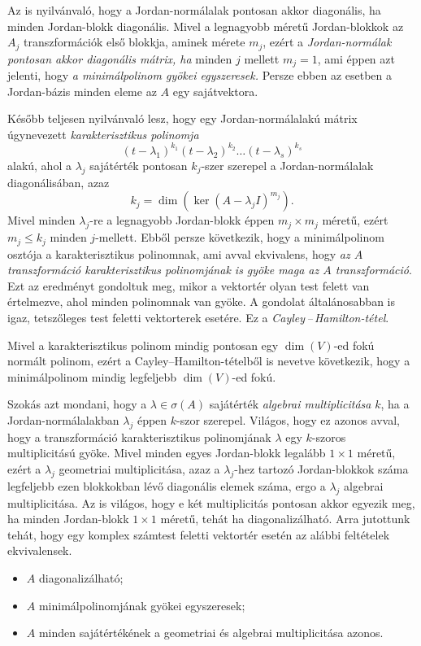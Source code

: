 \documentclass[a4paper, showtrims]{memoir}
\theoremstyle{plain}
\theoremstyle{remark}
\theoremstyle{definition}
\begin{document}
Az is nyilvánvaló, hogy a Jordan-normálalak pontosan akkor diagonális, ha minden Jordan-blokk diagonális.
Mivel a legnagyobb méretű Jordan-blokkok az $A_j$ transzformációk első blokkja, aminek mérete $m_j$, ezért a \emph{Jordan-normálak pontosan akkor diagonális mátrix, ha} minden $j$ mellett $m_j=1$,
ami éppen azt jelenti, hogy \emph{a minimálpolinom gyökei egyszeresek.}
Persze ebben az esetben a Jordan-bázis minden eleme az $A$ egy sajátvektora.

Később teljesen nyilvánvaló lesz, hogy egy Jordan-normálalakú mátrix
úgynevezett \emph{karakterisztikus polinomja}
\[
	\left( t-\lambda_1 \right)^{k_1}\left( t-\lambda_2 \right)^{k_2}\dots\left( t-\lambda_s \right)^{k_s}
\]
alakú,
ahol a $\lambda_j$ sajátérték pontosan $k_j$-szer szerepel a Jordan-normálalak diagonálisában,
azaz
\[
    k_j=\dim\left( \ker \left( A-\lambda_j I \right)^{m_j} \right).
\]
Mivel minden $\lambda_j$-re a legnagyobb Jordan-blokk éppen $m_j\times m_j$ méretű,
ezért $m_j\leq k_j$ minden $j$-mellett.
Ebből persze következik,
hogy a minimálpolinom osztója a karakterisztikus polinomnak, ami
avval ekvivalens,
hogy \emph{az $A$ transzformáció karakterisztikus polinomjának is gyöke maga az $A$ transzformáció}.
Ezt az eredményt gondoltuk meg, mikor a vektortér olyan test felett van értelmezve,
ahol minden polinomnak van gyöke.
A gondolat általánosabban is igaz, tetszőleges test feletti vektorterek esetére.
Ez a \emph{Cayley\,--\,Hamilton-tétel}.

Mivel a karakterisztikus polinom mindig pontosan egy $\dim(V)$-ed fokú normált polinom,
ezért a Cayley--Hamilton-tételből is nevetve következik,
hogy a minimálpolinom mindig legfeljebb $\dim(V)$-ed fokú.

Szokás azt mondani, hogy a $\lambda\in\sigma\left( A \right)$ sajátérték
\emph{algebrai multiplicitása} $k$,
ha a Jordan-normál\-a\-lak\-ban $\lambda_j$ éppen $k$-szor szerepel.
Világos, hogy ez azonos avval, hogy a transzformáció karakterisztikus polinomjának
$\lambda$ egy $k$-szoros multiplicitású gyöke.
Mivel minden egyes Jordan-blokk legalább $1\times 1$ méretű,
ezért a $\lambda_j$ geometriai multiplicitása,
azaz a $\lambda_j$-hez tartozó Jordan-blokkok száma legfeljebb ezen blokkokban lévő diagonális elemek száma,
ergo a $\lambda_j$ algebrai multiplicitása.
Az is világos, hogy e két multiplicitás pontosan akkor egyezik meg,
ha minden Jordan-blokk $1\times 1$ méretű, tehát ha diagonalizálható.
Arra jutottunk tehát,
hogy egy komplex számtest feletti vektortér esetén az alábbi feltételek ekvivalensek.
\begin{itemize}\tightlist
	\item[\textendash] $A$ diagonalizálható;
	\item[\textendash] $A$ minimálpolinomjának gyökei egyszeresek;
	\item[\textendash] $A$ minden sajátértékének a geometriai és algebrai multiplicitása azonos.
\end{itemize}
\end{document}
